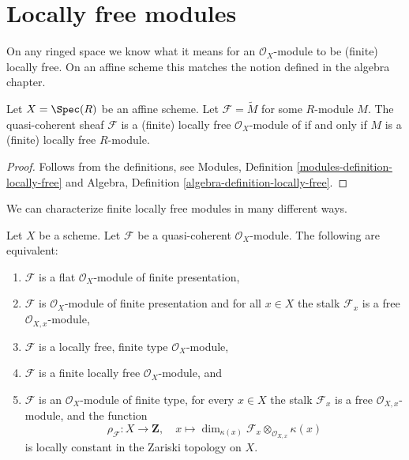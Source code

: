 \section{Locally free modules}
\label{section-finite-locally-free}

\noindent
On any ringed space we know what it means for an $\mathcal{O}_X$-module
to be (finite) locally free. On an affine scheme this matches the notion
defined in the algebra chapter.

\begin{lemma}
\label{lemma-locally-free-module}
Let $X = \Spec(R)$ be an affine scheme.
Let $\mathcal{F} = \widetilde{M}$ for some $R$-module $M$.
The quasi-coherent sheaf $\mathcal{F}$ is a (finite) locally free
$\mathcal{O}_X$-module of if and only if $M$ is a (finite)
locally free $R$-module.
\end{lemma}

\begin{proof}
Follows from the definitions, see
Modules, Definition \ref{modules-definition-locally-free}
and
Algebra, Definition \ref{algebra-definition-locally-free}.
\end{proof}

\noindent
We can characterize finite locally free modules in many different ways.

\begin{lemma}
\label{lemma-finite-locally-free}
Let $X$ be a scheme.
Let $\mathcal{F}$ be a quasi-coherent $\mathcal{O}_X$-module.
The following are equivalent:
\begin{enumerate}
\item $\mathcal{F}$ is a flat $\mathcal{O}_X$-module of finite presentation,
\item $\mathcal{F}$ is $\mathcal{O}_X$-module of finite presentation and
for all $x \in X$ the stalk $\mathcal{F}_x$ is a free
$\mathcal{O}_{X, x}$-module,
\item $\mathcal{F}$ is a locally free, finite type $\mathcal{O}_X$-module,
\item $\mathcal{F}$ is a finite locally free $\mathcal{O}_X$-module, and
\item $\mathcal{F}$ is an $\mathcal{O}_X$-module of finite type,
for every $x \in X$ the stalk $\mathcal{F}_x$ is a free
$\mathcal{O}_{X, x}$-module, and the function
$$
\rho_\mathcal{F} : X \to \mathbf{Z}, \quad
x \longmapsto
\dim_{\kappa(x)} \mathcal{F}_x \otimes_{\mathcal{O}_{X, x}} \kappa(x)
$$
is locally constant in the Zariski topology on $X$.
\end{enumerate}
\end{lemma}

